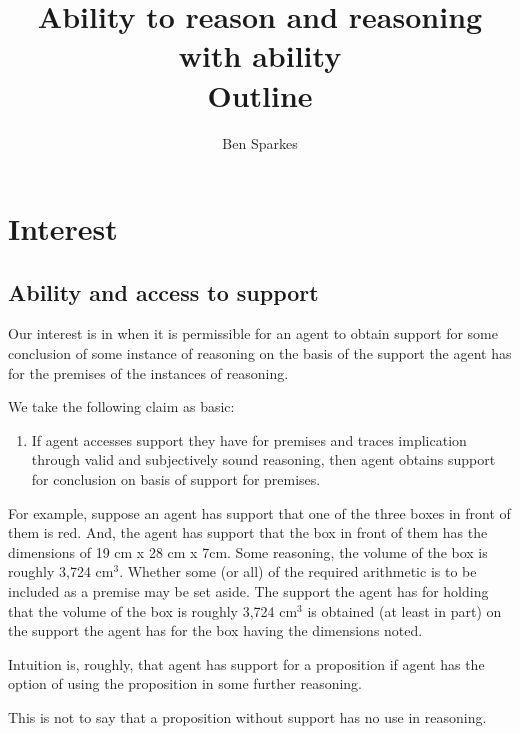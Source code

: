 \documentclass[10pt]{article}
\title{
  Ability to reason and reasoning with ability \\
  \large Outline
}
\author{Ben Sparkes}
\begin{document}


\maketitle

\section{Interest}
\label{sec:interest}

\subsection{Ability and access to support}
\label{sec:abil-access-supp}

\begin{note}
  Our interest is in when it is permissible for an agent to obtain support for some conclusion of some instance of reasoning on the basis of the support the agent has for the premises of the instances of reasoning.

  We take the following claim as basic:
  \begin{enumerate}[label=\bP{}, ref=\bP{}]
  \item\label{prem:bP} If agent accesses support they have for premises and traces implication through valid and subjectively sound reasoning, then agent obtains support for conclusion on basis of support for premises.
  \end{enumerate}
  For example, suppose an agent has support that one of the three boxes in front of them is red.
  And, the agent has support that the box in front of them has the dimensions of 19 cm x 28 cm x 7cm.
  Some reasoning, the volume of the box is roughly 3,724 cm\(^{3}\).
  Whether some (or all) of the required arithmetic is to be included as a premise may be set aside.
  The support the agent has for holding that the volume of the box is roughly 3,724 cm\(^{3}\) is obtained (at least in part) on the support the agent has for the box having the dimensions noted.
\end{note}

\begin{note}[Support]
  Intuition is, roughly, that agent has support for a proposition if agent has the option of using the proposition in some further reasoning.

  This is not to say that a proposition without support has no use in reasoning.
  
\end{note}
\end{document}
